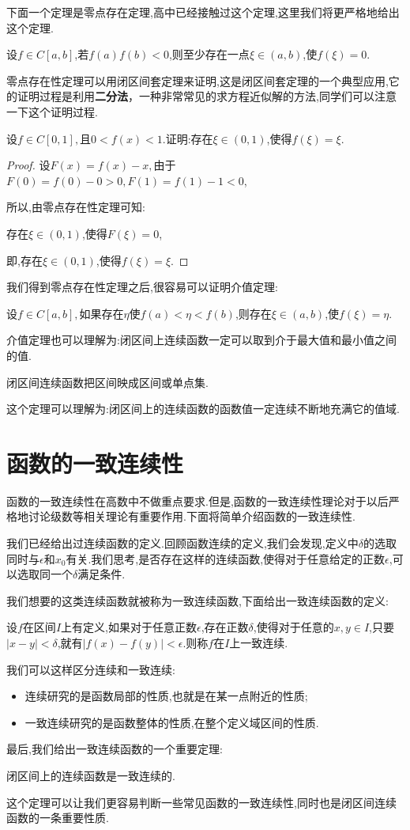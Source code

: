 下面一个定理是零点存在定理,高中已经接触过这个定理,这里我们将更严格地给出这个定理.
\begin{theorem}
	设$f\in C\left[a,b\right]$,若$f(a)f(b)<0$,则至少存在一点$\xi \in \left(a,b\right)$,使$f(\xi)=0$.
\end{theorem}
零点存在性定理可以用闭区间套定理来证明,这是闭区间套定理的一个典型应用,它的证明过程是利用\textbf{二分法}，一种非常常见的求方程近似解的方法,同学们可以注意一下这个证明过程.
\begin{example}
	设$f\in C\left[0,1\right],$且$0<f(x)<1$.证明:存在$\xi\in\left(0,1\right)$,使得$f(\xi)=\xi$.
\end{example}
\begin{proof}
	设$F(x)=f(x)-x,$由于$F(0)=f(0)-0>0,F(1)=f(1)-1<0$,

	所以,由零点存在性定理可知:

	存在$\xi\in\left(0,1\right)$,使得$F(\xi)=0$,

	即,存在$\xi\in\left(0,1\right)$,使得$f(\xi)=\xi$.

\end{proof}

我们得到零点存在性定理之后,很容易可以证明介值定理:
\begin{theorem}
	设$f\in C\left[a,b\right],$如果存在$\eta $使$f(a)<\eta <f(b)$,则存在$\xi\in\left(a,b\right)$,使$f(\xi)=\eta$.
\end{theorem}
介值定理也可以理解为:闭区间上连续函数一定可以取到介于最大值和最小值之间的值.

\begin{theorem}
	闭区间连续函数把区间映成区间或单点集.
\end{theorem}
这个定理可以理解为:闭区间上的连续函数的函数值一定连续不断地充满它的值域.

\section{函数的一致连续性}
函数的一致连续性在高数中不做重点要求.但是,函数的一致连续性理论对于以后严格地讨论级数等相关理论有重要作用.下面将简单介绍函数的一致连续性.

我们已经给出过连续函数的定义.回顾函数连续的定义,我们会发现,定义中$\delta$的选取同时与$\epsilon$和$x_0$有关.我们思考,是否存在这样的连续函数,使得对于任意给定的正数$\epsilon$,可以选取同一个$\delta$满足条件.

我们想要的这类连续函数就被称为一致连续函数,下面给出一致连续函数的定义:
\begin{definition}
	设$f$在区间$I$上有定义,如果对于任意正数$\epsilon$,存在正数$\delta$,使得对于任意的$x,y\in I$,只要$\left|x-y\right|<\delta$,就有$\left|f(x)-f(y)\right|<\epsilon$.则称$f$在$I$上一致连续.
\end{definition}

我们可以这样区分连续和一致连续:
\begin{itemize}
	\item 连续研究的是函数局部的性质,也就是在某一点附近的性质;
	\item 一致连续研究的是函数整体的性质,在整个定义域区间的性质.
\end{itemize}

最后,我们给出一致连续函数的一个重要定理:
\begin{theorem}
	闭区间上的连续函数是一致连续的.
\end{theorem}
这个定理可以让我们更容易判断一些常见函数的一致连续性,同时也是闭区间连续函数的一条重要性质.